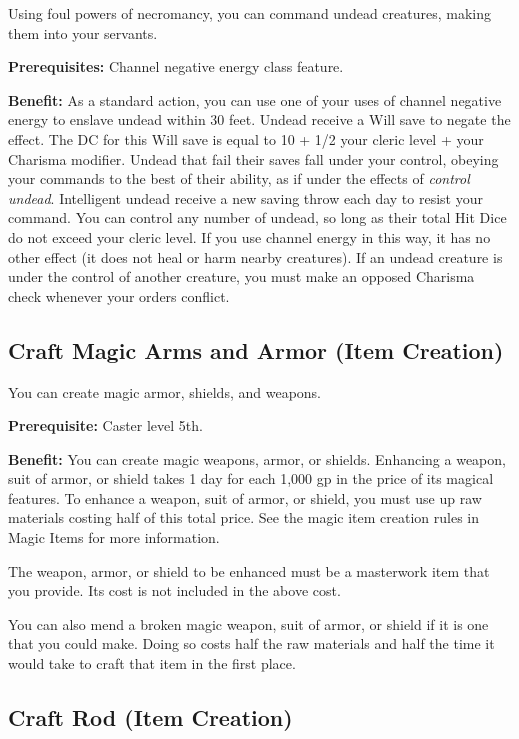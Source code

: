 				
Using foul powers of necromancy, you can command undead creatures, making them into your servants.
				
\textbf{Prerequisites:} Channel negative energy class feature.
				
\textbf{Benefit:} As a standard action, you can use one of your uses of channel negative energy to enslave undead within 30 feet. Undead receive a Will save to negate the effect. The DC for this Will save is equal to 10 + 1/2 your cleric level + your Charisma modifier. Undead that fail their saves fall under your control, obeying your commands to the best of their ability, as if under the effects of \textit{control undead}. Intelligent undead receive a new saving throw each day to resist your command. You can control any number of undead, so long as their total Hit Dice do not exceed your cleric level. If you use channel energy in this way, it has no other effect (it does not heal or harm nearby creatures). If an undead creature is under the control of another creature, you must make an opposed Charisma check whenever your orders conflict.
				
\subsection{Craft Magic Arms and Armor (Item Creation)}

				
You can create magic armor, shields, and weapons.
				
\textbf{Prerequisite:} Caster level 5th.
				
\textbf{Benefit:} You can create magic weapons, armor, or shields. Enhancing a weapon, suit of armor, or shield takes 1 day for each 1,000 gp in the price of its magical features. To enhance a weapon, suit of armor, or shield, you must use up raw materials costing half of this total price. See the magic item creation rules in Magic Items for more information.

The weapon, armor, or shield to be enhanced must be a masterwork item that you provide. Its cost is not included in the above cost.

You can also mend a broken magic weapon, suit of armor, or shield if it is one that you could make. Doing so costs half the raw materials and half the time it would take to craft that item in the first place.
				
\subsection{Craft Rod (Item Creation)}

